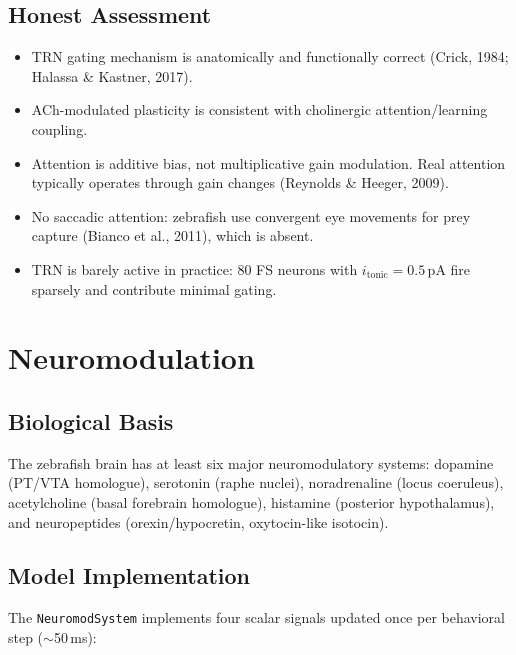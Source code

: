 \documentclass[11pt,a4paper]{article}
\begin{document}
\subsection{Honest Assessment}

\begin{itemize}[leftmargin=*]
\item[\textcolor{realistic}{$\checkmark$}] TRN gating mechanism is anatomically
  and functionally correct (Crick, 1984; Halassa \& Kastner, 2017).
\item[\textcolor{realistic}{$\checkmark$}] ACh-modulated plasticity is consistent
  with cholinergic attention/learning coupling.
\item[\textcolor{missing}{$\times$}] Attention is additive bias, not multiplicative
  gain modulation.  Real attention typically operates through gain changes
  (Reynolds \& Heeger, 2009).
\item[\textcolor{missing}{$\times$}] No saccadic attention: zebrafish use convergent
  eye movements for prey capture (Bianco et al., 2011), which is absent.
\item[\textcolor{missing}{$\times$}] TRN is barely active in practice: 80 FS neurons
  with $i_\text{tonic} = 0.5$\,pA fire sparsely and contribute minimal gating.
\end{itemize}

\section{Neuromodulation}
\label{sec:neuromod}

\subsection{Biological Basis}

The zebrafish brain has at least six major neuromodulatory systems:
dopamine (PT/VTA homologue), serotonin (raphe nuclei), noradrenaline (locus
coeruleus), acetylcholine (basal forebrain homologue), histamine (posterior
hypothalamus), and neuropeptides (orexin/hypocretin, oxytocin-like isotocin).

\subsection{Model Implementation}

The \texttt{NeuromodSystem} implements four scalar signals updated once per
behavioral step ($\sim$50\,ms):
\end{document}
